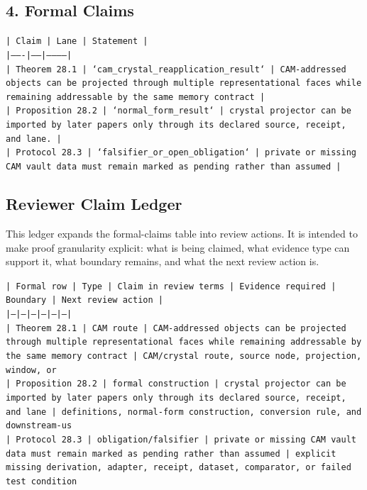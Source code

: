 \documentclass[11pt]{article}
\begin{document}
\subsection*{4. Formal Claims}

\noindent\texttt{| Claim | Lane | Statement |}\\
\noindent\texttt{|-------|------|-----------|}\\
\noindent\texttt{| Theorem 28.1 | `cam\_crystal\_reapplication\_result` | CAM-addressed objects can be projected through multiple representational faces while remaining addressable by the same memory contract |}\\
\noindent\texttt{| Proposition 28.2 | `normal\_form\_result` | crystal projector can be imported by later papers only through its declared source, receipt, and lane. |}\\
\noindent\texttt{| Protocol 28.3 | `falsifier\_or\_open\_obligation` | private or missing CAM vault data must remain marked as pending rather than assumed |}\\

\subsection*{Reviewer Claim Ledger}

This ledger expands the formal-claims table into review actions. It is intended to make proof granularity explicit: what is being claimed, what evidence type can support it, what boundary remains, and what the next review action is.

\noindent\texttt{| Formal row | Type | Claim in review terms | Evidence required | Boundary | Next review action |}\\
\noindent\texttt{|---|---|---|---|---|---|}\\
\noindent\texttt{| Theorem 28.1 | CAM route | CAM-addressed objects can be projected through multiple representational faces while remaining addressable by the same memory contract | CAM/crystal route, source node, projection, window, or}\\
\noindent\texttt{| Proposition 28.2 | formal construction | crystal projector can be imported by later papers only through its declared source, receipt, and lane | definitions, normal-form construction, conversion rule, and downstream-us}\\
\noindent\texttt{| Protocol 28.3 | obligation/falsifier | private or missing CAM vault data must remain marked as pending rather than assumed | explicit missing derivation, adapter, receipt, dataset, comparator, or failed test condition }\\
\end{document}
